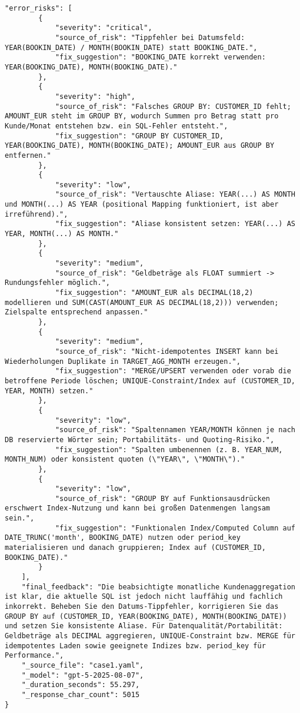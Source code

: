 \begin{lstlisting}[caption={Ausgabe: GPT-5 Anwendungsfall 1 Konsistenzdurchlauf},label={gpt_case1_prompt2}]
    "error_risks": [
        {
            "severity": "critical",
            "source_of_risk": "Tippfehler bei Datumsfeld: YEAR(BOOKIN_DATE) / MONTH(BOOKIN_DATE) statt BOOKING_DATE.",
            "fix_suggestion": "BOOKING_DATE korrekt verwenden: YEAR(BOOKING_DATE), MONTH(BOOKING_DATE)."
        },
        {
            "severity": "high",
            "source_of_risk": "Falsches GROUP BY: CUSTOMER_ID fehlt; AMOUNT_EUR steht im GROUP BY, wodurch Summen pro Betrag statt pro Kunde/Monat entstehen bzw. ein SQL-Fehler entsteht.",
            "fix_suggestion": "GROUP BY CUSTOMER_ID, YEAR(BOOKING_DATE), MONTH(BOOKING_DATE); AMOUNT_EUR aus GROUP BY entfernen."
        },
        {
            "severity": "low",
            "source_of_risk": "Vertauschte Aliase: YEAR(...) AS MONTH und MONTH(...) AS YEAR (positional Mapping funktioniert, ist aber irreführend).",
            "fix_suggestion": "Aliase konsistent setzen: YEAR(...) AS YEAR, MONTH(...) AS MONTH."
        },
        {
            "severity": "medium",
            "source_of_risk": "Geldbeträge als FLOAT summiert -> Rundungsfehler möglich.",
            "fix_suggestion": "AMOUNT_EUR als DECIMAL(18,2) modellieren und SUM(CAST(AMOUNT_EUR AS DECIMAL(18,2))) verwenden; Zielspalte entsprechend anpassen."
        },
        {
            "severity": "medium",
            "source_of_risk": "Nicht-idempotentes INSERT kann bei Wiederholungen Duplikate in TARGET_AGG_MONTH erzeugen.",
            "fix_suggestion": "MERGE/UPSERT verwenden oder vorab die betroffene Periode löschen; UNIQUE-Constraint/Index auf (CUSTOMER_ID, YEAR, MONTH) setzen."
        },
        {
            "severity": "low",
            "source_of_risk": "Spaltennamen YEAR/MONTH können je nach DB reservierte Wörter sein; Portabilitäts- und Quoting-Risiko.",
            "fix_suggestion": "Spalten umbenennen (z. B. YEAR_NUM, MONTH_NUM) oder konsistent quoten (\"YEAR\", \"MONTH\")."
        },
        {
            "severity": "low",
            "source_of_risk": "GROUP BY auf Funktionsausdrücken erschwert Index-Nutzung und kann bei großen Datenmengen langsam sein.",
            "fix_suggestion": "Funktionalen Index/Computed Column auf DATE_TRUNC('month', BOOKING_DATE) nutzen oder period_key materialisieren und danach gruppieren; Index auf (CUSTOMER_ID, BOOKING_DATE)."
        }
    ],
    "final_feedback": "Die beabsichtigte monatliche Kundenaggregation ist klar, die aktuelle SQL ist jedoch nicht lauffähig und fachlich inkorrekt. Beheben Sie den Datums-Tippfehler, korrigieren Sie das GROUP BY auf (CUSTOMER_ID, YEAR(BOOKING_DATE), MONTH(BOOKING_DATE)) und setzen Sie konsistente Aliase. Für Datenqualität/Portabilität: Geldbeträge als DECIMAL aggregieren, UNIQUE-Constraint bzw. MERGE für idempotentes Laden sowie geeignete Indizes bzw. period_key für Performance.",
    "_source_file": "case1.yaml",
    "_model": "gpt-5-2025-08-07",
    "_duration_seconds": 55.297,
    "_response_char_count": 5015
}
\end{lstlisting}

